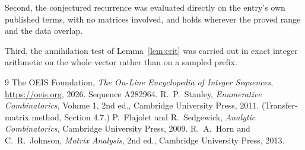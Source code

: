 \documentclass[11pt,a4paper]{article}
\theoremstyle{plain}
\theoremstyle{definition}
\begin{document}
Second, the conjectured recurrence was evaluated directly on the entry's own published terms,
with no matrices involved, and holds wherever the proved range and the data overlap.

Third, the annihilation test of Lemma~\ref{lem:crit} was carried out in exact integer
arithmetic on the whole vector rather than on a sampled prefix.

\begin{thebibliography}{9}
 The OEIS Foundation, \emph{The On-Line Encyclopedia of Integer
Sequences}, \url{https://oeis.org}, 2026. Sequence A282964.
 R.~P.~Stanley, \emph{Enumerative Combinatorics}, Volume 1, 2nd ed.,
Cambridge University Press, 2011. (Transfer-matrix method, Section 4.7.)
 P.~Flajolet and R.~Sedgewick, \emph{Analytic Combinatorics}, Cambridge
University Press, 2009.
 R.~A.~Horn and C.~R.~Johnson, \emph{Matrix Analysis}, 2nd ed., Cambridge
University Press, 2013.
\end{thebibliography}
\end{document}
